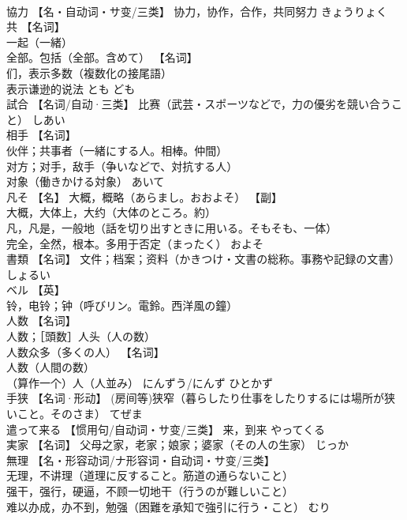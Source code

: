 \documentclass[8pt]{extreport}
\begin{document}
\begin{CJK}{UTF8}{min}
\\	協力	【名・自动词・サ变/三类】 协力，协作，合作，共同努力	きょうりょく	
\\	共	【名词】 
\\	一起（一緒） 
\\	全部。包括（全部。含めて） 【名词】 
\\	们，表示多数（複数化の接尾語） 
\\	表示谦逊的说法	とも ども	
\\	試合	【名词/自动·三类】 比赛（武芸・スポーツなどで，力の優劣を競い合うこと）	しあい	
\\	相手	【名词】 
\\	伙伴；共事者（一緒にする人。相棒。仲間） 
\\	对方；对手，敌手（争いなどで、対抗する人） 
\\	对象（働きかける対象）	あいて	
\\	凡そ	【名】 大概，概略（あらまし。おおよそ） 【副】 
\\	大概，大体上，大约（大体のところ。約） 
\\	凡，凡是，一般地（話を切り出すときに用いる。そもそも、一体） 
\\	完全，全然，根本。多用于否定（まったく）	およそ	
\\	書類	【名词】 文件；档案；资料（かきつけ・文書の総称。事務や記録の文書）	しょるい	
\\	ベル	【英】 
\\	铃，电铃；钟（呼びリン。電鈴。西洋風の鐘）		
\\	人数	【名词】 
\\	人数；［頭数］人头（人の数） 
\\	人数众多（多くの人） 【名词】 
\\	人数（人間の数） 
\\	（算作一个）人（人並み）	にんずう/にんず ひとかず	
\\	手狭	【名词·形动】 (房间等)狭窄（暮らしたり仕事をしたりするには場所が狭いこと。そのさま）	てぜま	
\\	遣って来る	【惯用句/自动词・サ变/三类】 来，到来	やってくる	
\\	実家	【名词】 父母之家，老家；娘家；婆家（その人の生家）	じっか	
\\	無理	【名・形容动词/ナ形容词・自动词・サ变/三类】 
\\	无理，不讲理（道理に反すること。筋道の通らないこと） 
\\	强干，强行，硬逼，不顾一切地干（行うのが難しいこと） 
\\	难以办成，办不到，勉强（困難を承知で強引に行う・こと）	むり	

\end{CJK}
\end{document}
